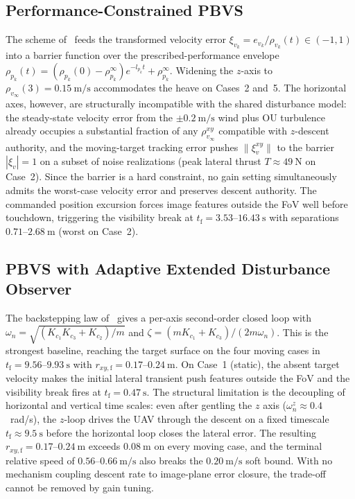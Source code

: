\documentclass{IEEEtaes}
\begin{document}
\subsection{Performance-Constrained PBVS \cite{lin2022}}
The scheme of~\cite{lin2022} feeds the transformed velocity error $\xi_{v_k}=e_{v_k}/\rho_{v_k}(t)\in(-1,1)$ into a barrier function over the prescribed-performance envelope $\rho_{p_k}(t)=(\rho_{p_k}(0)-\rho_{p_k}^\infty)e^{-l_{p_k}t}+\rho_{p_k}^\infty$. Widening the $z$-axis to $\rho_{v_\infty}(3)=0.15~\text{m/s}$ accommodates the heave on Cases~2 and~5. The horizontal axes, however, are structurally incompatible with the shared disturbance model: the steady-state velocity error from the $\pm 0.2~\text{m/s}$ wind plus OU turbulence already occupies a substantial fraction of any $\rho_{v_\infty}^{xy}$ compatible with $z$-descent authority, and the moving-target tracking error pushes $\|\xi_v^{xy}\|$ to the barrier $|\xi_v|=1$ on a subset of noise realizations (peak lateral thrust $T\approx 49~\text{N}$ on Case~2). Since the barrier is a hard constraint, no gain setting simultaneously admits the worst-case velocity error and preserves descent authority. The commanded position excursion forces image features outside the FoV well before touchdown, triggering the visibility break at $t_\text{f}=3.53$--$16.43~\text{s}$ with separations $0.71$--$2.68~\text{m}$ (worst on Case~2).

\subsection{PBVS with Adaptive Extended Disturbance Observer \cite{zhang2026}}
The backstepping law of~\cite{zhang2026} gives a per-axis second-order closed loop with $\omega_n=\sqrt{(K_{c_1}K_{c_3}+K_{c_2})/m}$ and $\zeta=(mK_{c_1}+K_{c_3})/(2m\omega_n)$. This is the strongest baseline, reaching the target surface on the four moving cases in $t_\text{f}=9.56$--$9.93~\text{s}$ with $r_{xy,\text{f}}=0.17$--$0.24~\text{m}$. On Case~1 (static), the absent target velocity makes the initial lateral transient push features outside the FoV and the visibility break fires at $t_\text{f}=0.47~\text{s}$. The structural limitation is the decoupling of horizontal and vertical time scales: even after gentling the $z$ axis ($\omega_n^z\approx 0.4$~rad/s), the $z$-loop drives the UAV through the descent on a fixed timescale $t_\text{f}\approx 9.5~\text{s}$ before the horizontal loop closes the lateral error. The resulting $r_{xy,\text{f}}=0.17$--$0.24~\text{m}$ exceeds $0.08~\text{m}$ on every moving case, and the terminal relative speed of $0.56$--$0.66~\text{m/s}$ also breaks the $0.20~\text{m/s}$ soft bound. With no mechanism coupling descent rate to image-plane error closure, the trade-off cannot be removed by gain tuning.
\end{document}
